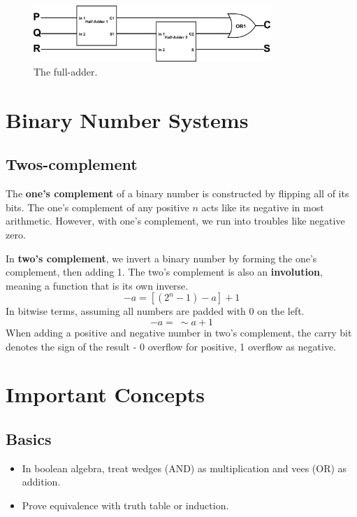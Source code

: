 \documentclass[11pt]{article}
\begin{document}
			\begin{figure}[htb]
				\centering
				\includegraphics[width=0.8\textwidth]{full-adder.png}
				\caption{The full-adder.}
				\label{fig:full-adder}
			\end{figure}
			
\section{Binary Number Systems}
	\subsection{Twos-complement}
		The \textbf{one's complement} of a binary number is constructed by flipping all of its bits. The one's complement of any positive $n$ acts like its negative in most arithmetic. However, with one's complement, we run into troubles like negative zero.
		
		In \textbf{two's complement}, we invert a binary number by forming the one's complement, then adding 1. The two's complement is also an \textbf{involution}, meaning a function that is its own inverse.
		\begin{equation}
			-a = [(2^n - 1) - a] + 1
		\end{equation}
		In bitwise terms, assuming all numbers are padded with 0 on the left.
		\begin{equation}
			-a =\ \sim a + 1
		\end{equation}
		When adding a positive and negative number in two's complement, the carry bit denotes the sign of the result - 0 overflow for positive, 1 overflow as negative.
		
\section*{Important Concepts}
	\subsection*{Basics}
		\begin{itemize}
			\item In boolean algebra, treat wedges (AND) as multiplication and vees (OR) as addition.
			\item Prove equivalence with truth table or induction.
		\end{itemize}
		
\end{document}
